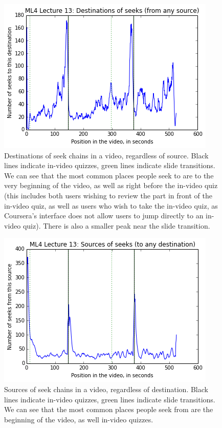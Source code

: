 \documentclass{sigchi}
\begin{document}
\begin{figure}
\includegraphics[width=1.0\columnwidth]{seekdestinations}
\caption{Destinations of seek chains in a video, regardless of source. Black lines indicate in-video quizzes, green lines indicate slide transitions. We can see that the most common places people seek to are to the very beginning of the video, as well as right before the in-video quiz (this includes both users wishing to review the part in front of the in-video quiz, as well as users who wish to take the in-video quiz, as Coursera's interface does not allow users to jump directly to an in-video quiz). There is also a smaller peak near the slide transition.}
\label{fig:seekdestinations}
\end{figure}

\begin{figure}
\includegraphics[width=1.0\columnwidth]{seeksources}
\caption{Sources of seek chains in a video, regardless of destination. Black lines indicate in-video quizzes, green lines indicate slide transitions. We can see that the most common places people seek from are the beginning of the video, as well in-video quizzes.}
\label{fig:seeksources}
\end{figure}
\end{document}
